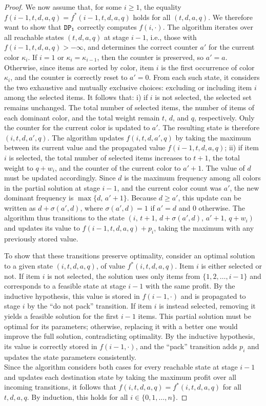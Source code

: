 \documentclass[preprint,11pt]{elsarticle}
\newcommand{\profit}{p}
\newcommand{\weight}{w}
\newcommand{\firstDP}{{\tt DP_1}}
\theoremstyle{definition}
\begin{document}
\begin{proof}
We now assume that, for some $i \ge 1$, the equality $f(i-1,t,d,a,q) = f^*(i-1,t,d,a,q)$ holds for all $(t,d,a,q)$. We therefore want to show that $\firstDP$ correctly computes $f(i,\cdot)$.
The algorithm iterates over all reachable states $(t,d,a,q)$ at stage $i-1$, i.e., those with $f(i-1,t,d,a,q) > -\infty$, and determines the correct counter $a'$ for the current color $\kappa_i$. 
If $i=1$ or $\kappa_i = \kappa_{i-1}$, then the counter is preserved, so $a' = a$. 
Otherwise, since items are sorted by color, item $i$
is the first occurrence of color $\kappa_i$, and the counter is correctly reset to $a' = 0$. 
From each such state, it considers the two exhaustive and mutually exclusive choices: excluding or including item $i$ among the selected items. 
It follows that: 
i) if $i$ is not selected, the selected set remains unchanged. The total number of selected items, the number of items of each dominant color, and the total weight remain $t$, $d$, and $q$, respectively. Only the counter for the current color is updated to $a'$. The resulting state is therefore $(i,t,d,a',q)$. The algorithm updates $f(i,t,d,a',q)$ by taking the maximum between its current value and the propagated value $f(i-1,t,d,a,q)$; 
ii) if item $i$ is selected, the total number of selected items increases to $t+1$, the total weight to $q+\weight_i$, and the counter of the current color to $a'+1$. 
The value of $d$ must be updated accordingly. 
Since $d$ is the maximum frequency among all colors in the partial solution at stage $i-1$, and the current color count was $a'$, the new dominant frequency is $\max\{d,\, a'+1\}$. 
Because $d \ge a'$, this update can be written as $d + \sigma(a',d)$, where
$\sigma(a',d) = 1$ if $a' = d$ and $0$ otherwise. 
The algorithm thus transitions to the state $(i,\, t+1,\, d+\sigma(a',d),\, a'+1,\, q+\weight_i)$ and updates its value to $f(i-1,t,d,a,q) + \profit_i$, taking the maximum with any previously stored value.

\smallskip

To show that these transitions preserve optimality, consider an optimal solution to a given state $(i,t,d,a,q)$, of value $f^*(i,t,d,a,q)$. 
Item $i$ is either selected or not. 
If item $i$ is not selected, the solution uses only items from $\{1, 2,\dots,i-1\}$ and corresponds to a feasible state at stage $i-1$ with the same profit. 
By the inductive hypothesis, this value is stored in $f(i-1,\cdot)$ and is propagated to stage $i$ by the ``do not pack'' transition.
If item $i$ is instead selected, removing it yields a feasible solution for the first $i-1$ items. 
This partial solution must be optimal for its parameters; otherwise, replacing it with a better one would improve the full solution, contradicting optimality. 
By the inductive hypothesis, its value is correctly stored in $f(i-1,\cdot)$, and the ``pack'' transition adds
$\profit_i$ and updates the state parameters consistently.\\
Since the algorithm considers both cases for every reachable state at stage $i-1$ and updates each destination state by taking the maximum profit over all incoming transitions, it follows that $f(i,t,d,a,q) = f^*(i,t,d,a,q)$ for all $t,d,a,q$.
By induction, this holds for all $i \in \{0,1,\dots,n\}$.


\end{proof}
\end{document}
